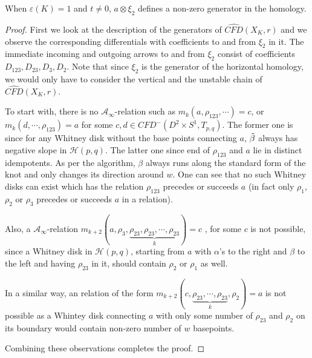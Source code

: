 \documentclass[10pt,a4paper]{amsart}
\newcommand{\cfdhat}{\widehat{\mathit{CFD}}}
\begin{document}
\begin{lemma}
\label{lemma} 
When $\varepsilon(K) = 1$ and $t \neq 0$, $a \otimes \xi_2$ defines a non-zero generator in the homology.  
\end{lemma}

\begin{proof}
  First we look at the description of the generators of $\cfdhat(X_K,r)$ and we observe the corresponding differentials with coefficients to and from  $\xi_2$ in it. The immediate incoming and outgoing arrows to and from $\xi_2$ consist of coefficients $D_{123},D_{23}, D_3,D_2$. Note that since $\xi_2$ is the generator of the horizontal homology, we would only have to consider the vertical and the unstable chain of $\cfdhat(X_K,r)$.
  
To start with, there is no $\mathcal{A}_{\infty}$-relation such as $m_k(a,\rho_{123},\cdots) = c$, or $m_k(d,\cdots,\rho_{123}) = a$ for some $c,d \in CFD^{-}(D^2\times S^1, T_{p,q})$. The former one is since for any Whitney disk without the base points connecting $a$, $\Tilde{\beta}$ always has negative slope in $\mathcal{H}(p,q)$. The latter one since end of $\rho_{123}$ and $a$ lie in distinct idempotents. As per the algorithm, $\beta$ always runs along the standard form of the knot and only changes its direction around $w$. One can see that no such Whitney disks can exist which has the relation $\rho_{123}$ precedes or succeeds $a$ (in fact only $\rho_1$, $\rho_2$ or $\rho_3$ precedes or succeeds $a$ in a relation).


Also, a $\mathcal{A}_{\infty}$-relation $m_{k+2}(a,\rho_3,\underbrace{\rho_{23},\rho_{23},\cdots,\rho_{23}}_{k}) = c$ , for some $c$ is not possible, since a Whitney disk in $\mathcal{H}(p,q)$, starting from $a$ with $\alpha$'s to the right and $\beta$ to the left and having $\rho_{23}$ in it, should contain $\rho_2$ or $\rho_1$ as well.


In a similar way, an relation of the form $m_{k+2}(c, \underbrace{\rho_{23}, \cdots, \rho_{23}}_{k}, \rho_2) = a$ is not possible as a Whintey disk connecting $a$ with only some number of $\rho_{23}$ and $\rho_2$ on its boundary would contain non-zero number of $w$ basepoints.


Combining these observations completes the proof. 
\end{proof}
\end{document}
